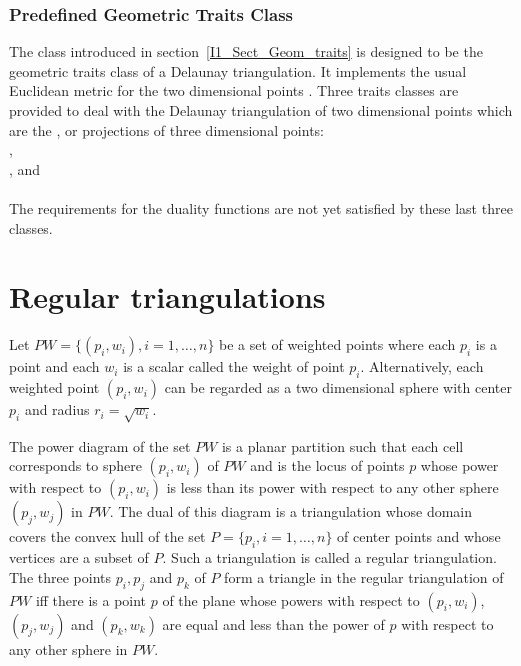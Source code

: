\subsubsection{Predefined Geometric Traits Class}
The class 
introduced in section~\ref{I1_Sect_Geom_traits} is 
 designed to be 
the geometric traits class of a Delaunay triangulation.
It implements the usual Euclidean metric
for the  two dimensional points .
Three traits classes are provided to deal with
the Delaunay triangulation of two dimensional points which are
the ,  or  projections of three dimensional points:\\
,\\
, and\\
 \\
The requirements for the duality functions are not yet satisfied by
these last three classes.



\section{Regular triangulations}
\label{I1_Sect_Regular}
Let ${  PW} = \{(p_i, w_i), i = 1, \ldots , n \}$ be a set of 
weighted points where each $p_i$ is a point and each $w_i$
is a scalar called the weight of point $p_i$.
Alternatively, each weighted point $(p_i, w_i)$ can be regarded
as a two dimensional sphere with center $p_i$ and radius $r_i=\sqrt{w_i}$.

The power diagram of the set ${  PW}$ is a planar partition 
such that each cell corresponds to sphere $(p_i, w_i)$ of ${  PW}$
and is the locus of points  $p$ whose power with respect to $(p_i, w_i)$
is less than its power with respect to any other sphere $(p_j, w_j)$
in ${  PW}$. 
The dual of this diagram is a triangulation 
whose domain covers the convex hull of the set 
${  P}= \{ p_i, i = 1, \ldots , n \}$ of center points
and whose vertices are a subset of ${  P}$.
Such a triangulation is called a regular triangulation.
The  three points $p_i, p_j$ and $p_k$ of ${  P}$
form a triangle in the regular triangulation of ${  PW}$
iff there is a point $p$ of the plane whose
powers with respect to $(p_i, w_i)$, $(p_j, w_j)$
and $(p_k, w_k)$ are equal and less than the power of $p$
with respect to any other sphere in  ${  PW}$.

